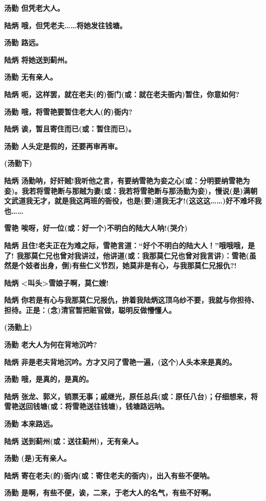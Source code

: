 \textbf{汤勤 但凭老大人。}

\textbf{陆炳 哦，但凭老夫\ldots{}\ldots{}将她发往钱塘。}

\textbf{汤勤 路远。}

\textbf{陆炳 将她送到蓟州。}

\textbf{汤勤 无有亲人。}

\textbf{陆炳
呃，这样罢，就在老夫(的)衙门(或：就在老夫衙内)暂住，你意如何?}

\textbf{汤勤 哦，将雪艳要暂住老大人(的)衙内?}

\textbf{陆炳 诶，暂且寄住而已(或：暂住而已)。}

\textbf{汤勤 人头定是假的，还要再审再审。}

\textbf{(汤勤下)}

\textbf{陆炳
汤勤呐，好奸贼!我听他之言，有要纳雪艳为妾之心(或：分明要纳雪艳为妾)。我若将雪艳断与那贼为妻(或：我若将雪艳断与那汤勤为妾)，慢说(是)满朝文武道我无才，就是我这两班的衙役，也是(要)道我无才!(这这这\ldots{}\ldots{})好不难坏我也\ldots{}\ldots{}}

\textbf{雪艳 唉呀，好一位(或：好一个)不明白的陆大人呐!(哭介)}

\textbf{陆炳
且住!老夫正在为难之际，雪艳言道：``好个不明白的陆大人！''哦哦哦，是了!
我那莫仁兄也曾对我讲过，他讲道(或：我那莫仁兄也曾对我言讲)：雪艳(虽然是个妓者出身，倒)有些仁义节烈，她莫非是有心，与我那莫仁兄报仇?!}

\textbf{陆炳 \textless{}叫头\textgreater{}雪娘子啊，莫仁嫂!}

\textbf{陆炳
你若是有心与我那莫仁兄报仇，拚着我陆炳这顶乌纱不要，我就与你担待、担待。正是：(念)清官暂把赃官做，聪明反做懵懂人。}

\textbf{(汤勤上)}

\textbf{汤勤 老大人为何在背地沉吟?}

\textbf{陆炳
非是老夫背地沉吟。方才又问了雪艳一遍，(这个)人头本来是真的。}

\textbf{汤勤 哦，是真的，是真的。}

\textbf{陆炳
张龙、郭义，销票无事；戚继光，原任总兵(或：原任八台)；仔细想来，将雪艳送回钱塘(或：将雪艳送往钱塘)，钱塘路远呐。}

\textbf{汤勤 本来路远。}

\textbf{陆炳 送到蓟州(或：送往蓟州)，无有亲人。}

\textbf{汤勤 (是)无有亲人。}

\textbf{陆炳 寄在老夫(的)衙内(或：寄住老夫的衙内)，出入有些不便呐。}

\textbf{汤勤 是啊，有些不便，诶，二来，于老大人的名气，有些不好啊。}

